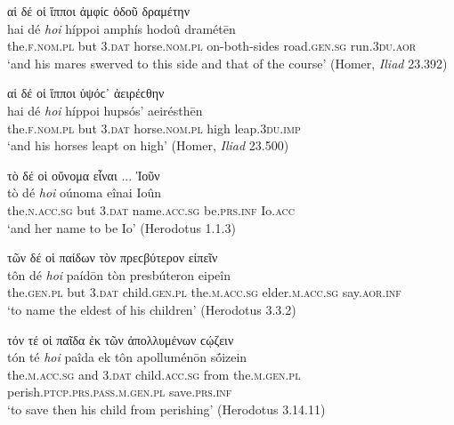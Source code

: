 \begin{exe}
\ex αἱ δέ {οἱ} ἵπποι ἀμφίϲ ὁδοῦ δραμέτην\\
\gll hai dé \emph{hoi} híppoi amphís hodoû dramétēn\\
the.\textsc{f.nom.pl} but \textsc{3.dat} horse.\textsc{nom.pl} on-both-sides road.\textsc{gen.sg} run.\textsc{3du.aor}\\
\trans `and his mares swerved to this side and that of the course' (Homer, \emph{Iliad} 23.392)
\label{genOiPostArt4}
\end{exe}

\begin{exe}
\ex αἱ δέ {οἱ} ἵπποι ὑψόϲ᾽ ἀειρέϲθην\\
\gll hai dé \emph{hoi} híppoi hupsós' aeirésthēn\\
the.\textsc{f.nom.pl} but \textsc{3.dat} horse\textsc{.nom.pl} high leap.\textsc{3du.imp}\\
\trans `and his horses leapt on high' (Homer, \emph{Iliad} 23.500)
\label{genOiPostArt5}
\end{exe}

\begin{exe}
\ex τὸ δέ {οἱ} οὔνομα εἶναι ... Ἰοῦν\\
\gll tò dé \emph{hoi} oúnoma eînai Ioûn\\
the.\textsc{n.acc.sg} but \textsc{3.dat} name.\textsc{acc.sg} be\textsc{.prs.inf} Io.\textsc{acc}\\
\trans `and her name to be Io' (Herodotus 1.1.3)
\label{genOiHerod}
\end{exe}

\begin{exe}
\ex τῶν δέ {οἱ} παίδων τὸν πρεϲβύτερον εἰπεῖν\\
\gll tôn dé \emph{hoi} paídōn tòn presbúteron eipeîn\\
the.\textsc{gen.pl} but \textsc{3.dat} child.\textsc{gen.pl} the.\textsc{m.acc.sg} elder.\textsc{m.acc.sg} say.\textsc{aor.inf}\\
\trans `to name the eldest of his children' (Herodotus 3.3.2)
\label{genOiIoun1}
\end{exe}

\begin{exe}
\ex τόν τέ {οἱ} παῖδα ἐκ τῶν ἀπολλυμένων ϲῴζειν\\
\gll tón té \emph{hoi} paîda ek tôn apolluménōn sṓizein\\
the.\textsc{m.acc.sg} and \textsc{3.dat} child.\textsc{acc.sg} from the.\textsc{m.gen.pl} perish.\textsc{ptcp.prs.pass.m.gen.pl} save.\textsc{prs.inf}\\
\trans `to save then his child from perishing' (Herodotus 3.14.11)
\label{genOiIoun2}
\end{exe}


